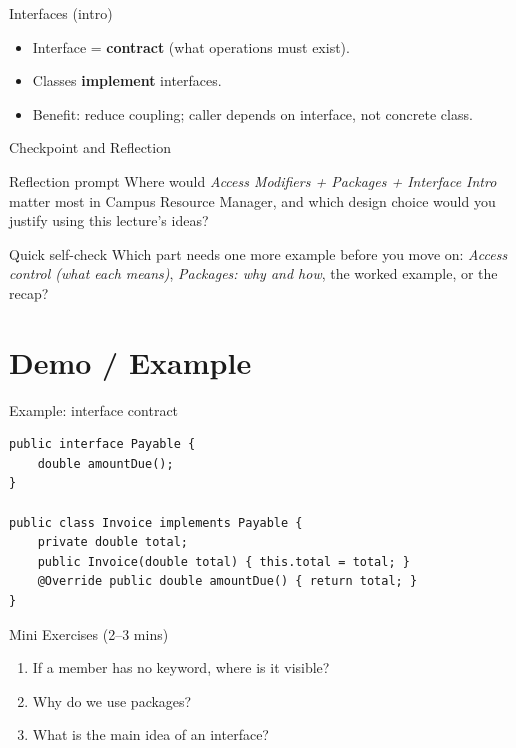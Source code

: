 \documentclass{beamer}
\begin{document}
\begin{frame}{Interfaces (intro)}
  \begin{itemize}[<+->]
    \item Interface = \textbf{contract} (what operations must exist).
    \item Classes \textbf{implement} interfaces.
    \item Benefit: reduce coupling; caller depends on interface, not concrete class.
  \end{itemize}
  \slidesources{\OOPSUnitIISources}
\end{frame}

\begin{frame}{Checkpoint and Reflection}
\begin{block}{Reflection prompt}
Where would \textit{Access Modifiers + Packages + Interface Intro} matter most in Campus Resource Manager, and which design choice would you justify using this lecture's ideas?
\end{block}
\begin{block}{Quick self-check}
Which part needs one more example before you move on: \textit{Access control (what each means)}, \textit{Packages: why and how}, the worked example, or the recap?
\end{block}
  \slidesources{\OOPSUnitIISources}
\end{frame}

\section{Demo / Example}
\label{sec:demo}

\begin{frame}[fragile]{Example: interface contract}
\begin{lstlisting}
public interface Payable {
    double amountDue();
}

public class Invoice implements Payable {
    private double total;
    public Invoice(double total) { this.total = total; }
    @Override public double amountDue() { return total; }
}
\end{lstlisting}
  \slidesources{\OOPSUnitIISources}
\end{frame}

\begin{frame}{Mini Exercises (2--3 mins)}
  \begin{enumerate}[<+->]
    \item If a member has no keyword, where is it visible?
    \item Why do we use packages?
    \item What is the main idea of an interface?
  \end{enumerate}
  \slidesources{\OOPSUnitIISources}
\end{frame}
\end{document}
